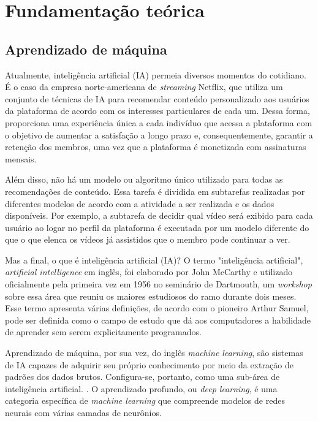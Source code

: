 
\chapter{Fundamentação teórica}

\section*{Aprendizado de máquina}

Atualmente, inteligência artificial (IA) permeia diversos 
momentos do cotidiano. É o caso da empresa norte-americana 
de \textit{streaming} Netflix, que utiliza um conjunto de 
técnicas de IA para recomendar conteúdo personalizado aos 
usuários da plataforma de acordo com os interesses 
particulares de cada um. Dessa forma, proporciona uma 
experiência única a cada indivíduo que acessa a plataforma 
com o objetivo de aumentar a satisfação a longo prazo e, 
consequentemente, garantir a retenção dos membros, uma vez 
que a plataforma é monetizada com assinaturas mensais. 

Além disso, não há um modelo ou algoritmo único utilizado 
para todas as recomendações de conteúdo. Essa tarefa é 
dividida em subtarefas realizadas por diferentes modelos de 
acordo com a atividade a ser realizada e os dados disponíveis. Por exemplo, a subtarefa de  decidir qual vídeo será exibido para cada usuário ao logar no perfil da plataforma é executada por um modelo diferente do que o que elenca os vídeos já assistidos que o membro pode continuar a ver. \cite{netflix}

Mas a final, o que é inteligência artificial (IA)? O termo 
"inteligência artificial", \textit{artificial intelligence} 
em inglês, foi elaborado por John McCarthy e utilizado 
oficialmente pela primeira vez em 1956 no seminário de 
Dartmouth, um \textit{workshop} sobre essa área que reuniu os 
maiores estudiosos do ramo durante dois meses. \cite{aima} 
Esse termo apresenta várias definições, de acordo com o 
pioneiro Arthur Samuel, pode ser definida como o campo de 
estudo que dá aos computadores a habilidade de aprender sem 
serem explicitamente programados. \cite{dl-oreilly} 

Aprendizado de máquina, por sua vez, do inglês 
\textit{machine learning}, são sistemas de IA capazes 
de adquirir seu próprio conhecimento por meio da extração 
de padrões dos dados brutos. Configura-se, portanto, como 
uma sub-área de inteligência artificial.
\cite{Goodfellow-et-al-2016}. O aprendizado profundo, ou 
\textit{deep learning}, é uma categoria específica de
 \textit{machine learning} que compreende modelos de redes 
 neurais com várias camadas de neurônios.\cite{d2l}

